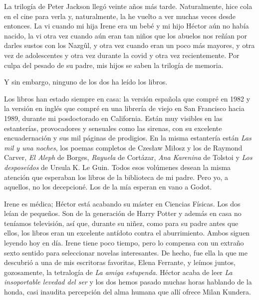La trilogía de Peter Jackson llegó veinte años más tarde. Naturalmente, hice cola en el cine para verla y, naturalmente, la he vuelto a ver muchas veces desde entonces. La vi cuando mi hija Irene era un bebé y mi hijo Héctor aún no había nacido, la vi otra vez cuando aún eran tan niños que los abuelos nos reñían por darles sustos con los Nazgûl, y otra vez cuando eran un poco más mayores, y otra vez de adolescentes y otra vez durante la covid y otra vez recientemente. Por culpa del pesado de su padre, mis hijos se saben la trilogía de memoria.

Y sin embargo, ninguno de los dos ha leído los libros.

Los libros han estado siempre en casa: la versión española que compré en 1982 y la versión en inglés que compré en una librería de viejo en San Francisco hacia 1989, durante mi posdoctorado en California. Están muy visibles en las estanterías, provocadores y sensuales como las sirenas, con su excelente encuadernación y sus mil páginas de prodigios. En la misma estantería están \emph{Las mil y una noches}, los poemas completos de Czesław Miłosz y los de Raymond Carver, \emph{El Aleph} de Borges, \emph{Rayuela} de Cortázar, \emph{Ana Karenina} de Tolstoi y \emph{Los desposeídos} de Ursula K. Le Guin. Todos esos volúmenes desean la misma atención que esperaban los libros de la biblioteca de mi padre. Pero yo, a aquellos, no los decepcioné. Los de la mía esperan en vano a Godot.

Irene es médica; Héctor está acabando su máster en Ciencias Físicas. Los dos leían de pequeños. Son de la generación de Harry Potter y además en casa no teníamos televisión, así que, durante su niñez, como para su padre antes que ellos, los libros eran un excelente antídoto contra el aburrimiento. Ambos siguen leyendo hoy en día. Irene tiene poco tiempo, pero lo compensa con un extraño sexto sentido para seleccionar novelas interesantes. De hecho, fue ella la que me descubrió a una de mis escritoras favoritas, Elena Ferrante, y leímos juntos, gozosamente, la tetralogía de \emph{La amiga estupenda}. Héctor acaba de leer \emph{La insoportable levedad del ser} y los dos hemos pasado muchas horas hablando de la honda, casi inaudita percepción del alma humana que allí ofrece Milan Kundera.


